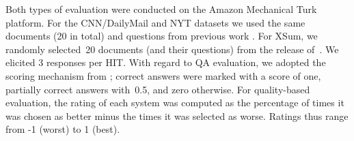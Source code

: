 \documentclass[11pt,a4paper]{article}
\makeatletter
\newcommand{\thickhline}{\noalign {\ifnum 0=`}\fi \hrule height 1pt
    \futurelet \reserved@a \@xhline
}
\makeatother
\begin{document}
    
    
    
    
    \begin{table}[t]
        \caption{QA-based evaluation. Models with~  are
            significantly different  from \textsc{BertSum} (using a paired
            student t-test; \mbox{}). Table cells are filled
            with --- whenever system output is not available.}
        \label{human-ext}
    \end{table}
    
    
    Both types of evaluation were conducted on the Amazon Mechanical
    Turk platform. For the CNN/DailyMail and NYT datasets we used the
    same documents (20 in total) and questions from previous work
    \cite{narayan2018ranking,yang19sumo}. For XSum, we randomly
    selected~20 documents (and their questions) from the release
    of~\citet{xsum}. We elicited 3 responses per HIT.  With regard to
    QA evaluation, we adopted the scoring mechanism from
    \citet{clarke2010discourse}; correct answers were marked with a
    score of one, partially correct answers with~0.5, and zero
    otherwise. For quality-based evaluation, the rating of each system
    was computed as the percentage of times it was chosen as better
    minus the times it was selected as worse. Ratings thus range from
    -1 (worst) to 1 (best).
    
\end{document}
